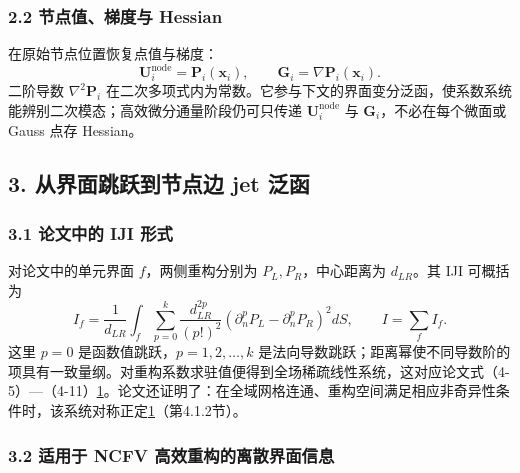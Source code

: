 \documentclass[
  12pt,
  UTF8]{ctexart}
\begin{document}
\hypertarget{ux8282ux70b9ux503cux68afux5ea6ux4e0e-hessian}{%
\subsubsection{2.2 节点值、梯度与
Hessian}\label{ux8282ux70b9ux503cux68afux5ea6ux4e0e-hessian}}

在原始节点位置恢复点值与梯度： \begin{equation}
\boldsymbol U_i^{\mathrm{node}}=\boldsymbol P_i(\boldsymbol x_i),\qquad
\boldsymbol G_i=\nabla\boldsymbol P_i(\boldsymbol x_i).\end{equation} 二阶导数 \(\nabla^2\boldsymbol P_i\)
在二次多项式内为常数。它参与下文的界面变分泛函，使系数系统能辨别二次模态；高效微分通量阶段仍可只传递
\(\boldsymbol U_i^{\mathrm{node}}\) 与
\(\boldsymbol G_i\)，不必在每个微面或 Gauss 点存 Hessian。

\hypertarget{ux4eceux754cux9762ux8df3ux8dc3ux5230ux8282ux70b9ux8fb9-jet-ux6cdbux51fd}{%
\subsection{3. 从界面跳跃到节点边 jet
泛函}\label{ux4eceux754cux9762ux8df3ux8dc3ux5230ux8282ux70b9ux8fb9-jet-ux6cdbux51fd}}

\hypertarget{ux8bbaux6587ux4e2dux7684-iji-ux5f62ux5f0f}{%
\subsubsection{3.1 论文中的 IJI
形式}\label{ux8bbaux6587ux4e2dux7684-iji-ux5f62ux5f0f}}

对论文中的单元界面 \(f\)，两侧重构分别为 \(P_L,P_R\)，中心距离为
\(d_{LR}\)。其 IJI 可概括为 \begin{equation}
I_f=\frac1{d_{LR}}\int_f\sum_{p=0}^{k}
\frac{d_{LR}^{2p}}{(p!)^2}
\left(\partial_n^p P_L-\partial_n^p P_R\right)^2dS,
\qquad I=\sum_f I_f.\end{equation} 这里 \(p=0\) 是函数值跳跃，\(p=1,2,\ldots,k\)
是法向导数跳跃；距离幂使不同导数阶的项具有一致量纲。对重构系数求驻值便得到全场稀疏线性系统，这对应论文式（4-5）---（4-11）\protect\hyperlink{ref_001}{1}。论文还证明了：在全域网格连通、重构空间满足相应非奇异性条件时，该系统对称正定\protect\hyperlink{ref_001}{1}（第4.1.2节）。

\hypertarget{ux9002ux7528ux4e8e-ncfv-ux9ad8ux6548ux91cdux6784ux7684ux79bbux6563ux754cux9762ux4fe1ux606f}{%
\subsubsection{3.2 适用于 NCFV
高效重构的离散界面信息}\label{ux9002ux7528ux4e8e-ncfv-ux9ad8ux6548ux91cdux6784ux7684ux79bbux6563ux754cux9762ux4fe1ux606f}}
\end{document}
